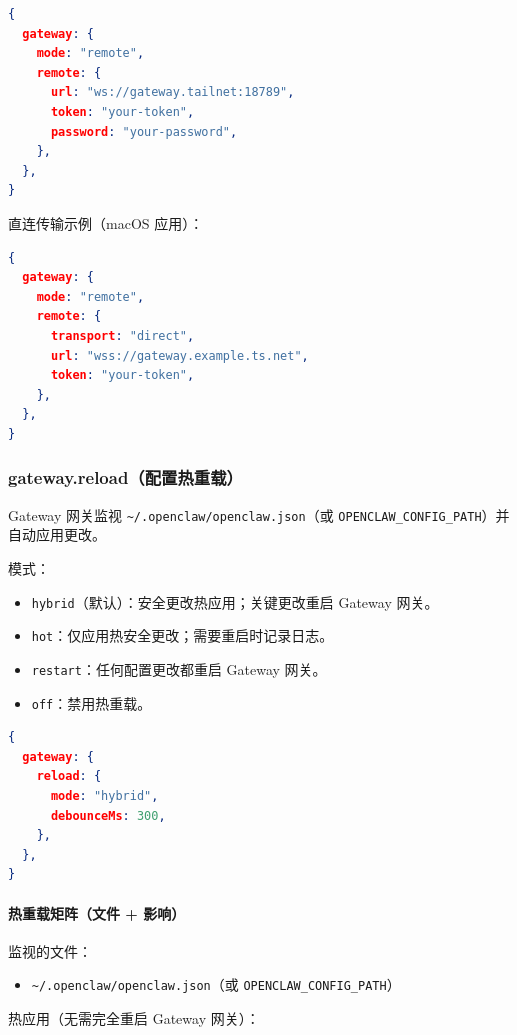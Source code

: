 \begin{lstlisting}[language=json]
{
  gateway: {
    mode: "remote",
    remote: {
      url: "ws://gateway.tailnet:18789",
      token: "your-token",
      password: "your-password",
    },
  },
}
\end{lstlisting}


直连传输示例（macOS 应用）：

\begin{lstlisting}[language=json]
{
  gateway: {
    mode: "remote",
    remote: {
      transport: "direct",
      url: "wss://gateway.example.ts.net",
      token: "your-token",
    },
  },
}
\end{lstlisting}


\subsubsection{gateway.reload（配置热重载）}


Gateway 网关监视 \texttt{\textasciitilde{}/.openclaw/openclaw.json}（或 \texttt{OPENCLAW\_CONFIG\_PATH}）并自动应用更改。

模式：

\begin{itemize}
  \item \texttt{hybrid}（默认）：安全更改热应用；关键更改重启 Gateway 网关。
  \item \texttt{hot}：仅应用热安全更改；需要重启时记录日志。
  \item \texttt{restart}：任何配置更改都重启 Gateway 网关。
  \item \texttt{off}：禁用热重载。
\end{itemize}


\begin{lstlisting}[language=json]
{
  gateway: {
    reload: {
      mode: "hybrid",
      debounceMs: 300,
    },
  },
}
\end{lstlisting}


\paragraph{热重载矩阵（文件 + 影响）}


监视的文件：

\begin{itemize}
  \item \texttt{\textasciitilde{}/.openclaw/openclaw.json}（或 \texttt{OPENCLAW\_CONFIG\_PATH}）
\end{itemize}


热应用（无需完全重启 Gateway 网关）：

